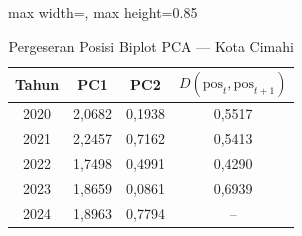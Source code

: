 \begin{table}[H]
\centering
\caption{Pergeseran Posisi Biplot PCA --- Kota Cimahi} \label{tab:appjarak_pca_skor_kota_cimahi}
\begin{adjustbox}{max width=\textwidth, max height=0.85\textheight}
\begin{tabular}{|c|c|c|c|}
\hline
\textbf{Tahun} & \textbf{PC1} & \textbf{PC2} & \textbf{$D(\text{pos}_t, \text{pos}_{t+1})$} \\
\hline
2020 & 2,0682 & 0,1938 & 0,5517 \\
2021 & 2,2457 & 0,7162 & 0,5413 \\
2022 & 1,7498 & 0,4991 & 0,4290 \\
2023 & 1,8659 & 0,0861 & 0,6939 \\
2024 & 1,8963 & 0,7794 & -- \\
\hline
\end{tabular}
\end{adjustbox}
\end{table}